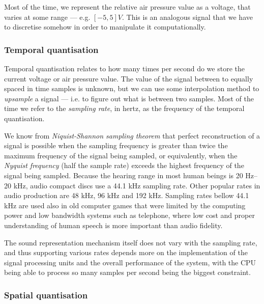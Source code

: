 Most of the time, we represent the relative air pressure value as a
voltage, that varies at some range --- e.g. $[ -5, 5 ] V$. This is an
analogous signal that we have to discretise somehow in order to
manipulate it computationally.

\subsubsection{Temporal quantisation}

Temporal quantisation relates to how many times per second do we store
the current voltage or air pressure value. The value of the signal
between to equally spaced in time samples is unknown, but we can use
some interpolation method to \emph{upsample} a signal --- i.e. to
figure out what is between two samples. Most of the time we refer to
the \emph{sampling rate}, in hertz, as the frequency of the temporal
quantisation.

We know from \emph{Niquist-Shannon sampling theorem} that perfect
reconstruction of a signal is possible when the sampling frequency is
greater than twice the maximum frequency of the signal being sampled,
or equivalently, when the \emph{Nyquist frequency} (half the sample
rate) exceeds the highest frequency of the signal being
sampled. Because the hearing range in most human beings is 20 Hz--20
kHz, audio compact discs use a 44.1 kHz sampling rate. Other popular
rates in audio production are 48 kHz, 96 kHz and 192 kHz. Sampling
rates bellow 44.1 kHz are used also in old computer games that were
limited by the computing power and low bandwidth systems such as
telephone, where low cost and proper understanding of human speech is
more important than audio fidelity.

The sound representation mechanism itself does not vary with the
sampling rate, and thus supporting various rates depends more on the
implementation of the signal processing units and the overall
performance of the system, with the CPU being able to process so many
samples per second being the biggest constraint.

\subsubsection{Spatial quantisation}

